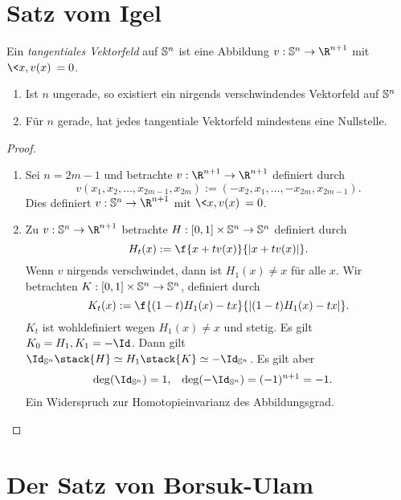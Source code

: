 \section{Satz vom Igel}


\begin{df}
	Ein \emph{tangentiales Vektorfeld} auf $\S^n$ ist eine Abbildung $v: \S^n \to \R^{n+1}$ mit $\<x, v(x)\> = 0$.
\end{df}

\begin{st}
	\begin{enumerate}[(1)]
		\item
			Ist $n$ ungerade, so existiert ein nirgends verschwindendes Vektorfeld auf $\S^n$
		\item
			Für $n$ gerade, hat jedes tangentiale Vektorfeld mindestens eine Nullstelle.
	\end{enumerate}
	\begin{proof}
		\begin{enumerate}[(1)]
			\item
				Sei $n = 2m - 1$ und betrachte
				$v: \R^{n+1} \to \R^{n+1}$ definiert durch
				\[
					v(x_1, x_2, \dotsc, x_{2m-1}, x_{2m})
					:= (-x_2, x_1, \dotsc, -x_{2m}, x_{2m-1}).
				\]
				Dies definiert $v: \S^n \to \R^{n+1}$ mit $\<x, v(x)\> = 0$.
			\item
				Zu $v: \S^n \to \R^{n+1}$ betrachte
				$H: [0,1] \times \S^n \to \S^n$ definiert durch
				\[
					H_t(x) := \f {x+ tv(x)}{|x+tv(x)|}.
				\]
				Wenn $v$ nirgends verschwindet, dann ist $H_1(x) \neq x$ für alle $x$.
				Wir betrachten $K: [0,1] \times \S^n \to \S^n$, definiert durch
				\[
					K_t(x) := \f {(1-t) H_1(x) - tx}{|(1-t) H_1(x) - tx|}.
				\]
				$K_t$ ist wohldefiniert wegen $H_1(x) \neq x$ und stetig.
				Es gilt $K_0 = H_1, K_1 = -\Id$.
				Dann gilt $\Id_{\S^n} \stack{H}\homotopic H_1 \stack{K}\homotopic -\Id_{\S^n}$.
				Es gilt aber
				\begin{align*}
					\deg(\Id_{\S^n}) &= 1, &
					\deg(-\Id_{\S^n}) &= (-1)^{n+1} = - 1.
				\end{align*}
				Ein Widerspruch zur Homotopieinvarianz des Abbildungsgrad.
		\end{enumerate}
	\end{proof}
\end{st}


\section{Der Satz von Borsuk-Ulam}

